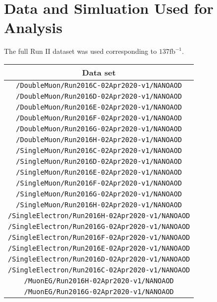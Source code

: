 \section{Data and Simluation Used for Analysis}
The full Run II dataset was used corresponding to $137 \text{fb}^{-1}$.
\begin{table}[!h]
\label{tab:datasets2016}
\begin{center}
{\footnotesize
\begin{tabular}{c}
\hline
Data set  \\
\hline

\texttt{/DoubleMuon/Run2016C-02Apr2020-v1/NANOAOD} \\ 
\texttt{/DoubleMuon/Run2016D-02Apr2020-v1/NANOAOD} \\ 
\texttt{/DoubleMuon/Run2016E-02Apr2020-v1/NANOAOD} \\ 
\texttt{/DoubleMuon/Run2016F-02Apr2020-v1/NANOAOD} \\ 
\texttt{/DoubleMuon/Run2016G-02Apr2020-v1/NANOAOD} \\ 
\texttt{/DoubleMuon/Run2016H-02Apr2020-v1/NANOAOD} \\ 
\texttt{/SingleMuon/Run2016C-02Apr2020-v1/NANOAOD} \\ 
\texttt{/SingleMuon/Run2016D-02Apr2020-v1/NANOAOD} \\ 
\texttt{/SingleMuon/Run2016E-02Apr2020-v1/NANOAOD} \\ 
\texttt{/SingleMuon/Run2016F-02Apr2020-v1/NANOAOD} \\ 
\texttt{/SingleMuon/Run2016G-02Apr2020-v1/NANOAOD} \\ 
\texttt{/SingleMuon/Run2016H-02Apr2020-v1/NANOAOD} \\ 
\texttt{/SingleElectron/Run2016H-02Apr2020-v1/NANOAOD} \\ 
\texttt{/SingleElectron/Run2016G-02Apr2020-v1/NANOAOD} \\ 
\texttt{/SingleElectron/Run2016F-02Apr2020-v1/NANOAOD} \\ 
\texttt{/SingleElectron/Run2016E-02Apr2020-v1/NANOAOD} \\ 
\texttt{/SingleElectron/Run2016D-02Apr2020-v1/NANOAOD} \\ 
\texttt{/SingleElectron/Run2016C-02Apr2020-v1/NANOAOD} \\ 
\texttt{/MuonEG/Run2016H-02Apr2020-v1/NANOAOD} \\ 
\texttt{/MuonEG/Run2016G-02Apr2020-v1/NANOAOD} \\ 

\end{tabular}}
\end{center}
\end{table}
